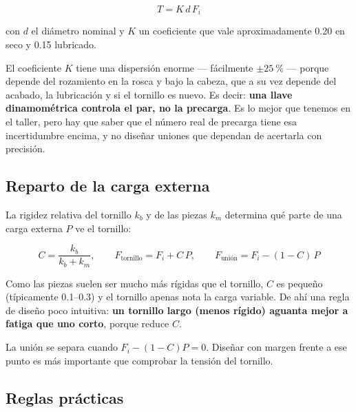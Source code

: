 \begin{equation}
  T = K\, d\, F_i
  \label{eq:par_apriete}
\end{equation}

con $d$ el diámetro nominal y $K$ un coeficiente que vale aproximadamente
\num{0.20} en seco y \num{0.15} lubricado.

\begin{ojo}
El coeficiente $K$ tiene una dispersión enorme --- fácilmente $\pm\SI{25}{\percent}$
--- porque depende del rozamiento en la rosca y bajo la cabeza, que a su vez
depende del acabado, la lubricación y si el tornillo es nuevo. Es decir:
\textbf{una llave dinamométrica controla el par, no la precarga}. Es lo mejor que
tenemos en el taller, pero hay que saber que el número real de precarga tiene esa
incertidumbre encima, y no diseñar uniones que dependan de acertarla con precisión.
\end{ojo}

\subsection{Reparto de la carga externa}

La rigidez relativa del tornillo $k_b$ y de las piezas $k_m$ determina qué parte
de una carga externa $P$ ve el tornillo:

\begin{equation}
  C = \frac{k_b}{k_b + k_m}, \qquad
  F_{\text{tornillo}} = F_i + C\,P, \qquad
  F_{\text{unión}} = F_i - (1-C)\,P
  \label{eq:reparto_carga}
\end{equation}

Como las piezas suelen ser mucho más rígidas que el tornillo, $C$ es pequeño
(típicamente \numrange{0.1}{0.3}) y el tornillo apenas nota la carga variable. De
ahí una regla de diseño poco intuitiva: \textbf{un tornillo largo (menos rígido)
aguanta mejor a fatiga que uno corto}, porque reduce $C$.

La unión se separa cuando $F_i - (1-C)P = 0$. Diseñar con margen frente a ese
punto es más importante que comprobar la tensión del tornillo.

\subsection{Reglas prácticas}

